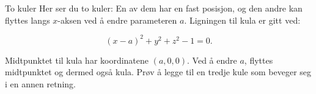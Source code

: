\begin{surferPage}{To kuler}
Her ser du to kuler: En av dem har en fast posisjon, og den andre kan flyttes langs $x$-aksen ved å endre parameteren $a$. 
Ligningen til kula er gitt ved:

\[(x-a)^2+y^2+z^2-1=0.\]

Midtpunktet til kula har koordinatene $(a,0,0)$. Ved å endre $a$, flyttes midtpunktet og dermed 
også kula. Prøv å legge til en tredje kule som beveger seg i en annen retning.
\end{surferPage}
